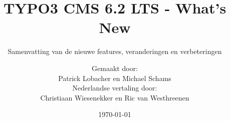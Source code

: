 %

%
%

\documentclass[t]{beamer}

\beamertemplatenavigationsymbolsempty

{
	\usetheme{typo3slides}
}

\title{TYPO3 CMS 6.2 LTS - What's New}
\subtitle{Samenvatting van de nieuwe features, veranderingen en verbeteringen}
\author{
	\centerline{Gemaakt door:}
	\centerline{Patrick Lobacher en Michael Schams}
	\vspace{0.4cm}
	\centerline{Nederlandse vertaling door:}
	Christiaan Wiesenekker en Ric van Westhreenen
}
\date{\today}



\sharefont


\begingroup
	[default]
	\begin{frame}
		\titlepage
	\end{frame}
\endgroup



